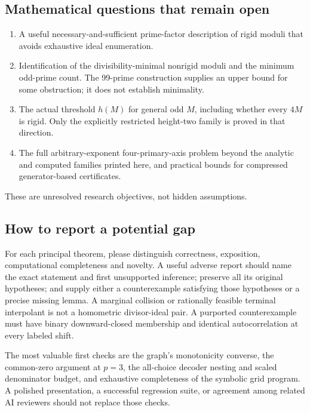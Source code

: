 \documentclass[10pt]{article}
\begin{document}
\subsection{Mathematical questions that remain open}
\begin{enumerate}
\item A useful necessary-and-sufficient prime-factor description of rigid
moduli that avoids exhaustive ideal enumeration.
\item Identification of the divisibility-minimal nonrigid moduli and the
minimum odd-prime count. The 99-prime construction supplies an upper
bound for some obstruction; it does not establish minimality.
\item The actual threshold $h(M)$ for general odd $M$, including whether
every $4M$ is rigid. Only the explicitly restricted height-two family
is proved in that direction.
\item The full arbitrary-exponent four-primary-axis problem beyond the
analytic and computed families printed here, and practical bounds for
compressed generator-based certificates.
\end{enumerate}

These are unresolved research objectives, not hidden assumptions.

\subsection{How to report a potential gap}
For each principal theorem, please distinguish correctness, exposition,
computational completeness and novelty. A useful adverse report should
name the exact statement and first unsupported inference; preserve all
its original hypotheses; and supply either a counterexample satisfying
those hypotheses or a precise missing lemma. A marginal collision or
rationally feasible terminal interpolant is not a homometric divisor-ideal
pair. A purported counterexample must have binary downward-closed
membership and identical autocorrelation at every labeled shift.

The most valuable first checks are the graph's monotonicity converse,
the common-zero argument at $p=3$, the all-choice decoder nesting and
scaled denominator budget, and exhaustive completeness of the symbolic
grid program. A polished presentation, a successful regression suite, or
agreement among related AI reviewers should not replace those checks.
\end{document}
